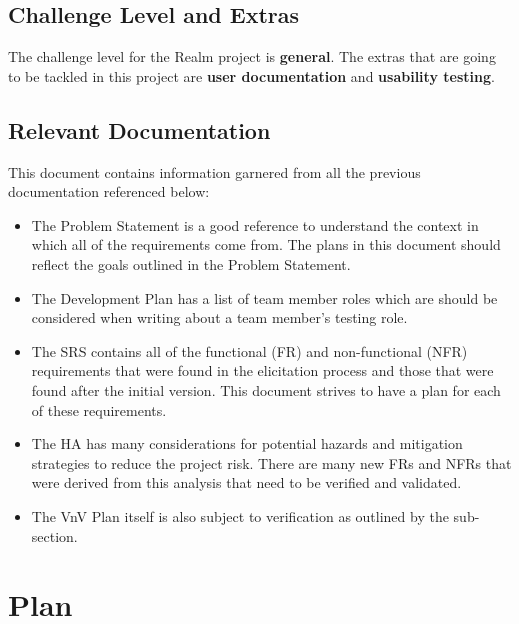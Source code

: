 \documentclass[12pt, titlepage]{article}
\begin{document}
\subsection{Challenge Level and Extras}

The challenge level for the Realm project is \textbf{general}. The extras that are going to be tackled in this project are \textbf{user documentation} and \textbf{usability testing}.

\subsection{Relevant Documentation}

This document contains information garnered from all the previous documentation referenced below:

\begingroup
\raggedright
\renewcommand{\refname}{}
\vspace{-3em}
\printbibliography
\endgroup

\begin{itemize}
  \item The Problem Statement \cite{ProblemStatement} is a good reference to understand the context in which all of the requirements come from. The plans in this document should reflect the goals outlined in the Problem Statement.
  \item The Development Plan \cite{DevelopmentPlan} has a list of team member roles which are should be considered when writing about a team member's testing role.
  \item The SRS \cite{SRS} contains all of the functional (FR) and non-functional (NFR) requirements that were found in the elicitation process and those that were found after the initial version. This document strives to have a plan for each of these requirements.
  \item The HA \cite{HA} has many considerations for potential hazards and mitigation strategies to reduce the project risk. There are many new FRs and NFRs that were derived from this analysis that need to be verified and validated.
  \item The VnV Plan \cite{VnV} itself is also subject to verification as outlined by the  sub-section.
\end{itemize}

\newrefsection

\section{Plan}
\label{sub:plan}
\end{document}
